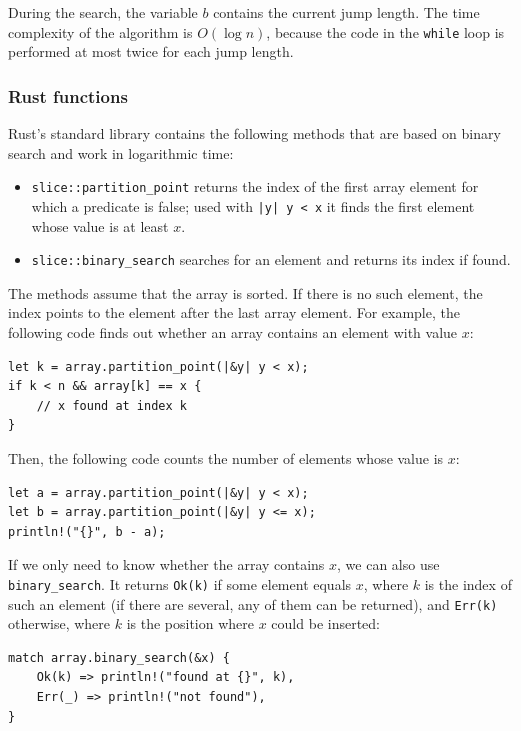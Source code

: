 During the search, the variable $b$
contains the current jump length.
The time complexity of the algorithm is $O(\log n)$,
because the code in the \texttt{while} loop
is performed at most twice for each jump length.

\subsubsection{Rust functions}

Rust's standard library contains the following methods
that are based on binary search and work in logarithmic time:

\begin{itemize}
\item \texttt{slice::partition\_point} returns the index of the
first array element for which a predicate is false;
used with \texttt{|y| y < x} it finds the first element
whose value is at least $x$.
\item \texttt{slice::binary\_search} searches for an element
and returns its index if found.
\end{itemize}

The methods assume that the array is sorted.
If there is no such element, the index points to
the element after the last array element.
For example, the following code finds out whether
an array contains an element with value $x$:

\begin{lstlisting}
let k = array.partition_point(|&y| y < x);
if k < n && array[k] == x {
    // x found at index k
}
\end{lstlisting}

Then, the following code counts the number of elements
whose value is $x$:

\begin{lstlisting}
let a = array.partition_point(|&y| y < x);
let b = array.partition_point(|&y| y <= x);
println!("{}", b - a);
\end{lstlisting}

If we only need to know whether the array contains $x$,
we can also use \texttt{binary\_search}.
It returns \texttt{Ok(k)} if some element equals $x$,
where $k$ is the index of such an element
(if there are several, any of them can be returned),
and \texttt{Err(k)} otherwise,
where $k$ is the position where $x$ could be inserted:

\begin{lstlisting}
match array.binary_search(&x) {
    Ok(k) => println!("found at {}", k),
    Err(_) => println!("not found"),
}
\end{lstlisting}

